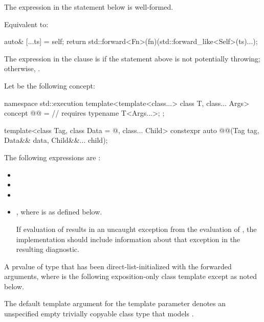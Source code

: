 \begin{itemdescr}
\pnum
\constraints
The expression in the  statement below is well-formed.

\pnum
\effects
Equivalent to:
\begin{codeblock}
auto& [...ts] = self;
return std::forward<Fn>(fn)(std::forward_like<Self>(ts)...);
\end{codeblock}

\pnum
\remarks
The expression in the  clause is 
if the  statement above is not potentially throwing;
otherwise, .
\end{itemdescr}

\pnum
Let  be the following concept:
\begin{codeblock}
namespace std::execution {
  template<template<class...> class T, class... Args>
  concept @@ =                                // \expos
    requires { typename T<Args...>; };
}
\end{codeblock}

\begin{itemdecl}
template<class Tag, class Data = @\seebelow@, class... Child>
  constexpr auto @@(Tag tag, Data&& data, Child&&... child);
\end{itemdecl}

\begin{itemdescr}
\pnum
\mandates
The following expressions are :
\begin{itemize}
\item {}
\item {}
\item {}
\item%
,
where  is
as defined below.

 \recommended
If evaluation of  results in
an uncaught exception from
the evaluation of ,
the implementation should include information about that exception in
the resulting diagnostic.
\end{itemize}

\pnum
\returns
A prvalue of
type 
that has been direct-list-initialized with the forwarded arguments,
where  is the following exposition-only class template except as noted below.

\pnum
\remarks
The default template argument for the  template parameter
denotes an unspecified empty trivially copyable class type
that models .
\end{itemdescr}

